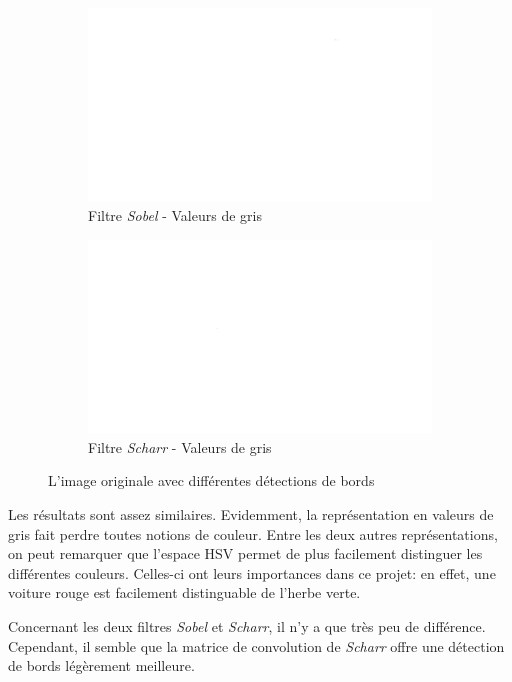 \begin{figure}[H]
    \bigskip
    \begin{subfigure}{.5\textwidth}
        \centering
        \includegraphics[width=.85\linewidth]{img/conception/image_process/edges_only/2.png}
        \caption{Filtre \textit{Sobel} - Valeurs de gris}
    \end{subfigure}%
    \begin{subfigure}{.5\textwidth}
        \centering
        \includegraphics[width=.85\linewidth]{img/conception/image_process/edges_only/5.png}
        \caption{Filtre \textit{Scharr} - Valeurs de gris}
    \end{subfigure}%
    \centering
    \caption{L'image originale avec différentes détections de bords}
    \label{fig:image_process_edges}
\end{figure}

Les résultats sont assez similaires. Evidemment, la représentation en valeurs de gris fait perdre toutes notions de couleur. Entre les deux autres représentations, on peut remarquer que l'espace HSV permet de plus facilement distinguer les différentes couleurs. Celles-ci ont leurs importances dans ce projet: en effet, une voiture rouge est facilement distinguable de l'herbe verte. 

Concernant les deux filtres \textit{Sobel} et \textit{Scharr}, il n'y a que très peu de différence. Cependant, il semble que la matrice de convolution de \textit{Scharr} offre une détection de bords légèrement meilleure.

